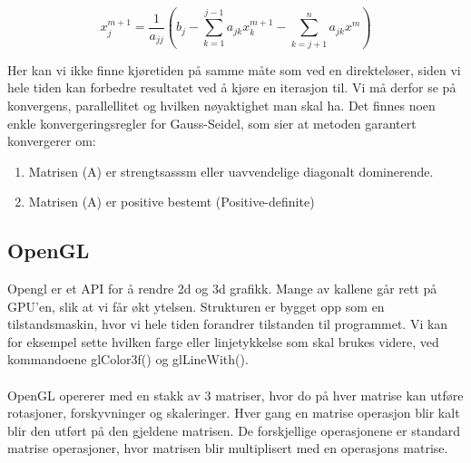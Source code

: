 \documentclass[10pt,a4paper, norsk]{article}
\begin{document}
 \begin{equation} \label{seideliterater}
   x_j^{m+1} = \frac{1}{a_{jj}}  (b_j - \sum_{k=1}^{j-1} a_{jk} x_k^{m+1} - \sum_{k=j+1}^n a_{jk}x^m)
 \end{equation}

Her kan vi ikke finne kjøretiden på samme måte som ved en direkteløser, siden vi hele tiden kan forbedre resultatet ved å kjøre en iterasjon til. Vi må derfor se på konvergens, parallellitet og hvilken nøyaktighet man skal ha. Det finnes noen enkle konvergeringsregler for Gauss-Seidel, som sier at metoden garantert konvergerer om:
\begin{enumerate}
\item Matrisen (A) er strengtsasssm eller uavvendelige diagonalt dominerende.
\item Matrisen (A) er positive bestemt (Positive-definite)
\end{enumerate}



\subsection{OpenGL}
Opengl er et API for å rendre 2d og 3d grafikk. Mange av kallene går rett på GPU'en, slik at vi får økt ytelsen. Strukturen er bygget opp som en tilstandsmaskin, hvor vi hele tiden forandrer tilstanden til programmet. Vi kan for eksempel sette hvilken farge eller linjetykkelse som skal brukes videre, ved kommandoene glColor3f() og glLineWith().

\paragraph{}
OpenGL opererer med en stakk av 3 matriser, hvor do på hver matrise kan utføre rotasjoner, forskyvninger og skaleringer. Hver gang en matrise operasjon blir kalt blir den utført på den gjeldene matrisen. De forskjellige operasjonene er standard matrise operasjoner, hvor matrisen blir multiplisert med en operasjons matrise.
\end{document}
